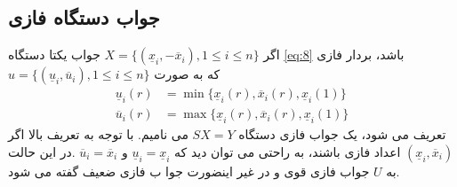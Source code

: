 	
	\subsection{جواب دستگاه فازی} 
	
	اگر 
	$ X = \lbrace\left(\underline{x}_i, -\overline{x}_i\right), 1 \leq i \leq n\rbrace $ 
	جواب یکتا دستگاه \ref{eq:8} باشد،‌ بردار فازی\\ 
	$ u = \lbrace\left(\underline{u}_i, \overline{u}_i\right), 1 \leq i \leq n\rbrace $ 
	که به صورت 
	\begin{align} 
	\underline{u}_i(r) & = \min\lbrace\underline{x}_i(r), \overline{x}_i(r), \underline{x}_i(1)\rbrace \\
	\overline{u}_i(r)  & = \max\lbrace\underline{x}_i(r), \overline{x}_i(r), \underline{x}_i(1)\rbrace
	\end{align}
	تعریف می شود، یک جواب فازی دستگاه $ SX = Y $ می نامیم. با توجه به تعریف بالا اگر 
	$ \left(\underline{x}_i, \overline{x}_i\right) $ 
	اعداد فازی باشند، به راحتی می توان دید که 
	$ \underline{u}_i = \underline{x}_i $ 
	و 
	$ \overline{u}_i = \overline{x}_i $ 
	.در این حالت به $ U $ جواب فازی قوی  و در غیر اینضورت جوا ب فازی ضعیف  گفته می شود. 
